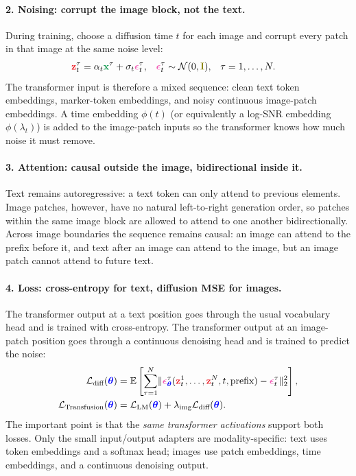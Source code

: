 \documentclass[usenames,dvipsnames]{article}
\DeclarePairedDelimiter{\norm}{\lVert}{\rVert}
\newcommand{\myvec}[1]{\mathbf{#1}}
\newcommand{\myvecsym}[1]{\boldsymbol{#1}}
\newcommand{\vx}{\myvec{\textcolor{ForestGreen}{x}}}
\newcommand{\vz}{\myvec{\textcolor{Red}{z}}}
\newcommand{\vI}{\myvec{\textcolor{olive}{I}}}
\newcommand{\vtheta}{\myvecsym{\textcolor{blue}{\theta}}}
\newcommand{\vepsilon}{\myvecsym{\textcolor{CarnationPink}{\epsilon}}}
\newcommand{\loss}{{\cal L}}
\newcommand{\gauss}{\mathcal{N}}
\newcommand{\E}{\mathbb{E}} %
\begin{document}
\paragraph{2. Noising: corrupt the image block, not the text.}
During training, choose a diffusion time $t$ for each image and corrupt every patch in that image at the same noise level:
\begin{align}
    \vz_t^\tau
    &= \alpha_t \vx^\tau + \sigma_t \vepsilon_t^\tau,
    &
    \vepsilon_t^\tau &\sim \gauss(0,\vI),
    &
    \tau &= 1,\ldots,N .
\end{align}
The transformer input is therefore a mixed sequence: clean text token embeddings, marker-token embeddings, and noisy continuous image-patch embeddings.  A time embedding $\phi(t)$ (or equivalently a log-SNR embedding $\phi(\lambda_t)$) is added to the image-patch inputs so the transformer knows how much noise it must remove.

\paragraph{3. Attention: causal outside the image, bidirectional inside it.}
Text remains autoregressive: a text token can only attend to previous elements.  Image patches, however, have no natural left-to-right generation order, so patches within the same image block are allowed to attend to one another bidirectionally.  Across image boundaries the sequence remains causal: an image can attend to the prefix before it, and text after an image can attend to the image, but an image patch cannot attend to future text.

\paragraph{4. Loss: cross-entropy for text, diffusion MSE for images.}
The transformer output at a text position goes through the usual vocabulary head and is trained with cross-entropy.  The transformer output at an image-patch position goes through a continuous denoising head and is trained to predict the noise:
\begin{align}
    \loss_{\text{diff}}(\vtheta)
    &=
    \E\left[
        \sum_{\tau=1}^{N}
        \norm{\vepsilon_{\vtheta}^{\tau}(\vz_t^1,\ldots,\vz_t^N,t,\text{prefix})
        - \vepsilon_t^\tau}_2^2
    \right],
    \\
    \loss_{\text{Transfusion}}(\vtheta)
    &=
    \loss_{\text{LM}}(\vtheta)
    + \lambda_{\text{img}} \loss_{\text{diff}}(\vtheta).
\end{align}
The important point is that the \emph{same transformer activations} support both losses.  Only the small input/output adapters are modality-specific: text uses token embeddings and a softmax head; images use patch embeddings, time embeddings, and a continuous denoising output.
\end{document}
